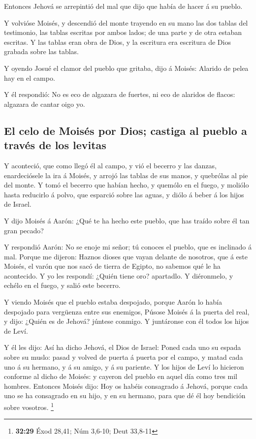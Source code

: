  Entonces Jehová se arrepintió del mal que dijo que había
de hacer á su pueblo.

 Y volvióse Moisés, y descendió del monte trayendo en su
mano las dos tablas del testimonio, las tablas escritas por ambos lados;
de una parte y de otra estaban escritas.  Y las tablas eran
obra de Dios, y la escritura era escritura de Dios grabada sobre las
tablas.

 Y oyendo Josué el clamor del pueblo que gritaba, dijo á
Moisés: Alarido de pelea hay en el campo.

 Y él respondió: No es eco de algazara de fuertes, ni eco
de alaridos de flacos: algazara de cantar oigo yo.

\hypertarget{el-celo-de-moisuxe9s-por-dios-castiga-al-pueblo-a-travuxe9s-de-los-levitas}{%
\subsection{El celo de Moisés por Dios; castiga al pueblo a través de
los
levitas}\label{el-celo-de-moisuxe9s-por-dios-castiga-al-pueblo-a-travuxe9s-de-los-levitas}}

 Y aconteció, que como llegó él al campo, y vió el becerro
y las danzas, enardeciósele la ira á Moisés, y arrojó las tablas de sus
manos, y quebrólas al pie del monte.  Y tomó el becerro que
habían hecho, y quemólo en el fuego, y moliólo hasta reducirlo á polvo,
que esparció sobre las aguas, y diólo á beber á los hijos de Israel.

 Y dijo Moisés á Aarón: ¿Qué te ha hecho este pueblo, que
has traído sobre él tan gran pecado?

 Y respondió Aarón: No se enoje mi señor; tú conoces el
pueblo, que es inclinado á mal.  Porque me dijeron: Haznos
dioses que vayan delante de nosotros, que á este Moisés, el varón que
nos sacó de tierra de Egipto, no sabemos qué le ha acontecido.
 Y yo les respondí: ¿Quién tiene oro? apartadlo. Y
diéronmelo, y echélo en el fuego, y salió este becerro.

 Y viendo Moisés que el pueblo estaba despojado, porque
Aarón lo había despojado para vergüenza entre sus enemigos,
 Púsose Moisés á la puerta del real, y dijo: ¿Quién es de
Jehová? júntese conmigo. Y juntáronse con él todos los hijos de Leví.

 Y él les dijo: Así ha dicho Jehová, el Dios de Israel:
Poned cada uno su espada sobre su muslo: pasad y volved de puerta á
puerta por el campo, y matad cada uno á su hermano, y á su amigo, y á su
pariente.  Y los hijos de Leví lo hicieron conforme al
dicho de Moisés: y cayeron del pueblo en aquel día como tres mil
hombres.  Entonces Moisés dijo: Hoy os habéis consagrado á
Jehová, porque cada uno se ha consagrado en su hijo, y en su hermano,
para que dé él hoy bendición sobre vosotros. \footnote{\textbf{32:29}
  Éxod 28,41; Núm 3,6-10; Deut 33,8-11}

